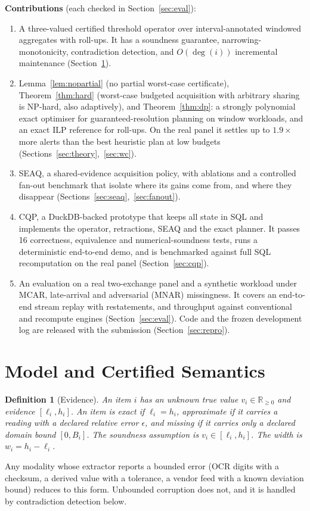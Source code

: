 \documentclass[conference]{IEEEtran}
\newtheorem{definition}{Definition}
\newcommand{\seaq}{SEAQ\xspace}
\begin{document}
\textbf{Contributions} (each checked in Section~\ref{sec:eval}):
\begin{enumerate}
\item A three-valued certified threshold operator over interval-annotated windowed aggregates with roll-ups. It
has a soundness guarantee, narrowing-monotonicity, contradiction detection, and $O(\deg(i))$ incremental
maintenance (Section~\ref{sec:model}).
\item Lemma~\ref{lem:nopartial} (no partial worst-case certificate), Theorem~\ref{thm:hard} (worst-case budgeted
acquisition with arbitrary sharing is NP-hard, also adaptively), and Theorem~\ref{thm:dp}: a strongly polynomial exact optimiser for guaranteed-resolution planning on window workloads, and an exact ILP
reference for roll-ups. On the real panel it settles up to $1.9\times$ more
alerts than the best heuristic plan at low budgets (Sections~\ref{sec:theory},~\ref{sec:wc}).
\item \seaq, a shared-evidence acquisition policy, with ablations and a controlled fan-out benchmark that isolate
where its gains come from, and where they disappear (Sections~\ref{sec:seaq},~\ref{sec:fanout}).
\item CQP, a DuckDB-backed prototype that keeps all state in SQL and implements the operator, retractions, \seaq{}
and the exact planner. It passes 16 correctness, equivalence and numerical-soundness tests, runs a deterministic end-to-end demo, and is
benchmarked against full SQL recomputation on the real panel (Section~\ref{sec:cqp}).
\item An evaluation on a real two-exchange panel and a synthetic workload under MCAR, late-arrival and adversarial
(MNAR) missingness. It covers an end-to-end stream replay with restatements, and throughput against conventional
and recompute engines (Section~\ref{sec:eval}). Code and the frozen development log are released with the
submission (Section~\ref{sec:repro}).
\end{enumerate}

\section{Model and Certified Semantics}
\label{sec:model}
\begin{definition}[Evidence]
An \emph{item} $i$ has an unknown true value $v_i\in\mathbb{R}_{\ge 0}$ and evidence $[\ell_i,h_i]$. An item
is \emph{exact} if $\ell_i=h_i$, \emph{approximate} if it carries a reading with a declared relative error
$\epsilon$, and \emph{missing} if it carries only a declared domain bound $[0,B_i]$. The \emph{soundness assumption}
is $v_i\in[\ell_i,h_i]$. The width is $w_i=h_i-\ell_i$.
\end{definition}
Any modality whose extractor reports a bounded error (OCR digits with a checksum, a derived value with a
tolerance, a vendor feed with a known deviation bound) reduces to this form. Unbounded corruption does not, and it is
handled by contradiction detection below.
\end{document}
